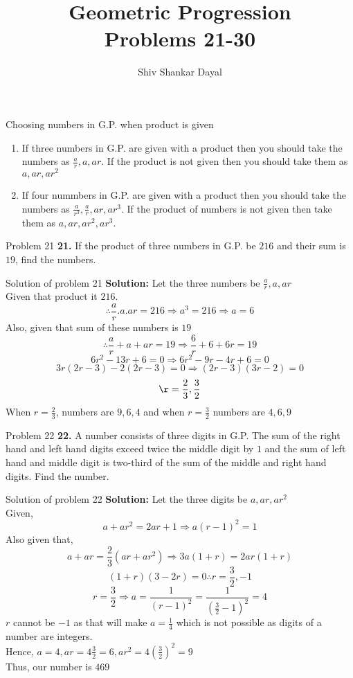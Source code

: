 \documentclass[aspectratio=1610,8pt]{beamer}
\title{Geometric Progression\\Problems 21-30}
\author[Shiv Shankar Dayal]{Shiv Shankar Dayal}
\begin{document}
\begin{frame}
       \titlepage
\end{frame}
\begin{frame}{Choosing numbers in G.P. when product is given}
  \begin{enumerate}
    \item If three numbers in G.P. are given with a product then you should
      take the numbers as $\frac{a}{r}, a, ar$. If the product is not given
      then you should take them as $a, ar, ar^2$
    \item If four nummbers in G.P. are given with a product then you should
      take the numbers as $\frac{a}{r^3}, \frac{a}{r}, ar, ar^3$. If the
      product of numbers is not given then take them as $a, ar, ar^2, ar^3$.
  \end{enumerate}
\end{frame}
\begin{frame}{Problem 21}
  \textbf{21.} If the product of three numbers in G.P. be $216$ and their sum
  is $19$, find the numbers.
\end{frame}
\begin{frame}{Solution of problem 21}
  \textbf{Solution:} Let the three numbers be $\frac{a}{r}, a, ar$\\
  Given that product it $216$.
  $$\therefore \frac{a}{r}.a.ar = 216 \Rightarrow a^3 = 216 \Rightarrow a = 6$$
  Also, given that sum of these numbers is $19$
  $$\therefore \frac{a}{r} + a + ar = 19 \Rightarrow \frac{6}{r} + 6 + 6r =
  19$$
  $$6r^2 - 13r + 6 = 0 \Rightarrow 6r^2 -9r - 4r + 6 = 0$$
  $$3r(2r - 3) - 2(2r -3) = 0 \Rightarrow (2r - 3)(3r -2) = 0$$
  $$\r = \frac{2}{3}, \frac{3}{2}$$
  When $r = \frac{2}{3}$, numbers are $9, 6, 4$ and when $r = \frac{3}{2}$
  numbers are $4, 6, 9$
\end{frame}
\begin{frame}{Problem 22}
  \textbf{22.} A number consists of three digits in G.P. The sum of the right
  hand and left hand digits exceed twice the middle digit by $1$ and the sum of
  left hand and middle digit is two-third of the sum of the middle and right
  hand digits. Find the number.
\end{frame}
\begin{frame}{Solution of problem 22}
  \textbf{Solution:} Let the three digits be $a, ar, ar^2$\\
  Given, $$a + ar^2 = 2ar + 1 \Rightarrow a(r - 1)^2 = 1$$
  Also given that, $$a + ar = \frac{2}{3}(ar + ar^2) \Rightarrow 3a(1 + r) =
  2ar(1 + r)$$
  $$(1 + r)(3 - 2r) = 0 \therefore r = \frac{3}{2}, -1$$
  $$r = \frac{3}{2} \Rightarrow a = \frac{1}{(r - 1)^2} = \frac{1}{(\frac{3}{2} -
    1)^2} = 4$$
  $r$ cannot be $-1$ as that will make $a = \frac{1}{4}$ which is not possible
  as digits of a number are integers.\\
  Hence, $a = 4, ar = 4\frac{3}{2} = 6, ar^2 = 4\left(\frac{3}{2}\right)^2 = 9$\\
  Thus, our number is $469$
\end{frame}
\end{document}
